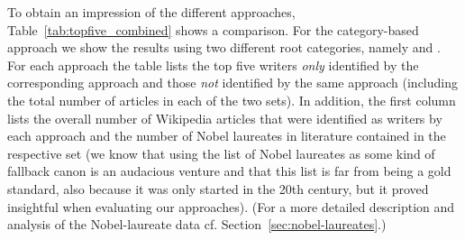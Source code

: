 \documentclass[a4paper,12pt]{scrartcl}
\begin{document}
To obtain an impression of the different approaches,
%
Table~\ref{tab:topfive_combined} shows a comparison.
%
For the category-based approach we show the results using two
different root categories, namely \xspace
and .
%
%
For each approach the table lists the top five writers \emph{only}
identified by the corresponding approach and those \emph{not}
identified by the same approach (including the total number of
articles in each of the two sets). In addition, the first column lists
the overall number of Wikipedia articles that were identified as
writers by each approach and the number of Nobel laureates in
literature contained in the respective set (we know that using the
list of Nobel laureates as some kind of fallback canon is an audacious
venture and that this list is far from being a gold standard, also
because it was only started in the 20th century, but
it proved insightful when evaluating our approaches). %
(For a more
  detailed description and analysis of the Nobel-laureate data
  cf. Section~\ref{sec:nobel-laureates}.) %
%
\end{document}
